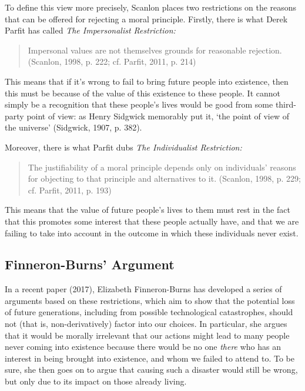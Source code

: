 \documentclass[man,11pt,a4paper]{apa7}
\begin{document}
To define this view more precisely, Scanlon places two restrictions on the reasons that can be offered for rejecting a moral principle. Firstly, there is what Derek Parfit has called \textit{The Impersonalist Restriction:}

\begin{quote}
Impersonal values are not themselves grounds for reasonable rejection. (Scanlon, 1998, p. 222; cf. Parfit, 2011, p. 214)
\end{quote}

This means that if it's wrong to fail to bring future people into existence, then this must be because of the value of this existence to these people. It cannot simply be a recognition that these people's lives would be good from some third-party point of view: as Henry Sidgwick memorably put it, `the point of view of the universe' (Sidgwick, 1907, p. 382).

Moreover, there is what Parfit dubs \textit{The Individualist Restriction:}

\begin{quote}
The justifiability of a moral principle depends only on individuals' reasons for objecting to that principle and alternatives to it. (Scanlon, 1998, p. 229; cf. Parfit, 2011, p. 193)
\end{quote}

This means that the value of future people's lives to them must rest in the fact that this promotes some interest that these people actually have, and that we are failing to take into account in the outcome in which these individuals never exist.

\subsection{Finneron-Burns' Argument}

In a recent paper (2017), Elizabeth Finneron-Burns has developed a series of arguments based on these restrictions, which aim to show that the potential loss of future generations, including from possible technological catastrophes, should not (that is, non-derivatively) factor into our choices. In particular, she argues that it would be morally irrelevant that our actions might lead to many people never coming into existence because there would be no one \textit{there} who has an interest in being brought into existence, and whom we failed to attend to. To be sure, she then goes on to argue that causing such a disaster would still be wrong, but only due to its impact on those already living.
\end{document}
